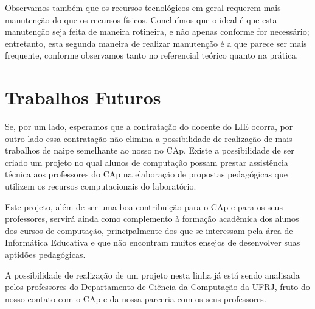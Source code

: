 Observamos também que os recursos tecnológicos em geral requerem mais manutenção do que os recursos físicos. Concluímos que o ideal é que esta manutenção seja feita de maneira rotineira, e não apenas conforme for necessário; entretanto, esta segunda maneira de realizar manutenção é a que parece ser mais frequente, conforme observamos tanto no referencial teórico quanto na prática.

\section{Trabalhos Futuros}\label{chp:LABEL_CHP_CONC_SEC_TRAB_FUT}

Se, por um lado, esperamos que a contratação do docente do LIE ocorra, por outro lado essa contratação não elimina a possibilidade de realização de mais trabalhos de naipe semelhante ao nosso no CAp. Existe a possibilidade de ser criado um projeto no qual alunos de computação possam prestar assistência técnica aos professores do CAp na elaboração de propostas pedagógicas que utilizem os recursos computacionais do laboratório.

Este projeto, além de ser uma boa contribuição para o CAp e para os seus professores, servirá ainda como complemento à formação acadêmica dos alunos dos cursos de computação, principalmente dos que se interessam pela área de Informática Educativa e que não encontram muitos ensejos de desenvolver suas aptidões pedagógicas.

A possibilidade de realização de um projeto nesta linha já está sendo analisada pelos professores do Departamento de Ciência da Computação da UFRJ, fruto do nosso contato com o CAp e da nossa parceria com os seus professores.
